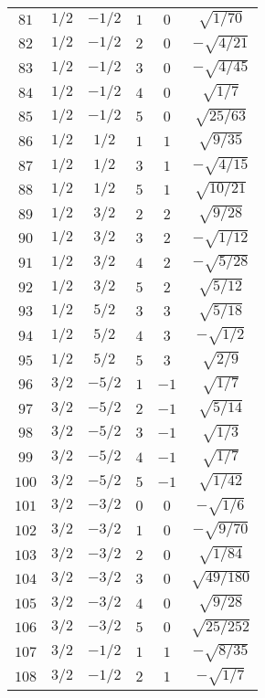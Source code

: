 \begin{table}
\begin{center}
\begin{tabular}{|c|c|c|c|c|c|}
$81$ & $1/2$ & $-1/2$ & $1$ & $0$ & $\sqrt{1/70}$ \\ 
$82$ & $1/2$ & $-1/2$ & $2$ & $0$ & $-\sqrt{4/21}$ \\ 
$83$ & $1/2$ & $-1/2$ & $3$ & $0$ & $-\sqrt{4/45}$ \\ 
$84$ & $1/2$ & $-1/2$ & $4$ & $0$ & $\sqrt{1/7}$ \\ 
$85$ & $1/2$ & $-1/2$ & $5$ & $0$ & $\sqrt{25/63}$ \\ 
$86$ & $1/2$ & $1/2$ & $1$ & $1$ & $\sqrt{9/35}$ \\ 
$87$ & $1/2$ & $1/2$ & $3$ & $1$ & $-\sqrt{4/15}$ \\ 
$88$ & $1/2$ & $1/2$ & $5$ & $1$ & $\sqrt{10/21}$ \\ 
$89$ & $1/2$ & $3/2$ & $2$ & $2$ & $\sqrt{9/28}$ \\ 
$90$ & $1/2$ & $3/2$ & $3$ & $2$ & $-\sqrt{1/12}$ \\ 
$91$ & $1/2$ & $3/2$ & $4$ & $2$ & $-\sqrt{5/28}$ \\ 
$92$ & $1/2$ & $3/2$ & $5$ & $2$ & $\sqrt{5/12}$ \\ 
$93$ & $1/2$ & $5/2$ & $3$ & $3$ & $\sqrt{5/18}$ \\ 
$94$ & $1/2$ & $5/2$ & $4$ & $3$ & $-\sqrt{1/2}$ \\ 
$95$ & $1/2$ & $5/2$ & $5$ & $3$ & $\sqrt{2/9}$ \\ 
$96$ & $3/2$ & $-5/2$ & $1$ & $-1$ & $\sqrt{1/7}$ \\ 
$97$ & $3/2$ & $-5/2$ & $2$ & $-1$ & $\sqrt{5/14}$ \\ 
$98$ & $3/2$ & $-5/2$ & $3$ & $-1$ & $\sqrt{1/3}$ \\ 
$99$ & $3/2$ & $-5/2$ & $4$ & $-1$ & $\sqrt{1/7}$ \\ 
$100$ & $3/2$ & $-5/2$ & $5$ & $-1$ & $\sqrt{1/42}$ \\ 
$101$ & $3/2$ & $-3/2$ & $0$ & $0$ & $-\sqrt{1/6}$ \\ 
$102$ & $3/2$ & $-3/2$ & $1$ & $0$ & $-\sqrt{9/70}$ \\ 
$103$ & $3/2$ & $-3/2$ & $2$ & $0$ & $\sqrt{1/84}$ \\ 
$104$ & $3/2$ & $-3/2$ & $3$ & $0$ & $\sqrt{49/180}$ \\ 
$105$ & $3/2$ & $-3/2$ & $4$ & $0$ & $\sqrt{9/28}$ \\ 
$106$ & $3/2$ & $-3/2$ & $5$ & $0$ & $\sqrt{25/252}$ \\ 
$107$ & $3/2$ & $-1/2$ & $1$ & $1$ & $-\sqrt{8/35}$ \\ 
$108$ & $3/2$ & $-1/2$ & $2$ & $1$ & $-\sqrt{1/7}$ \\ 

\end{tabular}
\end{center}
\end{table}
